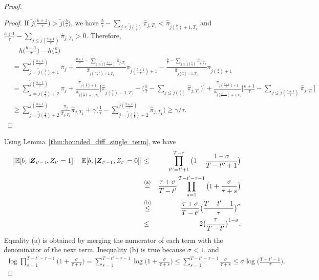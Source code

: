 \begin{proof}
\begin{proof}
If $\tilde{j}\big(\frac{b+1}{\tau}\big)  > \tilde{j}\big(\frac{b}{\tau}\big)$,  we have  $\frac{b}{\tau} - \sum_{j\leq \tilde{j}(\frac{b}{\tau})} \hat{\pi}_{j,T_1} < \hat{\pi}_{\tilde{j}(\frac{b}{\tau})+1,T_1}$ and $\frac{b+1}{\tau} - \sum_{j\leq \tilde{j}(\frac{b+1}{\tau})} \hat{\pi}_{j,T_1} > 0$. Therefore,
\begin{align}
&\quad h\big(\frac{b+1}{\tau}\big) - h\big(\frac{b}{\tau}\big) \nonumber\\
&= \sum_{j = \tilde{j}(\frac{b}{\tau}) + 1}^{\tilde{j}(\frac{b+1}{\tau})}\pi_{j} + \frac{\frac{b+1}{\tau} - \sum_{j\leq \tilde{j}(\frac{b+1}{\tau})} \hat{\pi}_{j,T_1}}{\hat{\pi}_{\tilde{j}(\frac{b+1}{\tau})+1,T_1}}\pi_{\tilde{j}(\frac{b+1}{\tau})+1} - \frac{\frac{b}{\tau} - \sum_{j\leq \tilde{j}(\frac{b}{\tau})} \hat{\pi}_{j,T_1}}{\hat{\pi}_{\tilde{j}(\frac{b}{\tau})+1,T_1}}\pi_{\tilde{j}(\frac{b}{\tau})+1}\nonumber\\
&= \sum_{j = \tilde{j}(\frac{b}{\tau})+2}^{\tilde{j}(\frac{b+1}{\tau})}\pi_{j} +\frac{\pi_{\tilde{j}(\frac{b}{\tau})+1}}{\hat{\pi}_{\tilde{j}(\frac{b}{\tau})+1,T_1}}\bigg[\hat{\pi}_{\tilde{j}(\frac{b}{\tau})+1,T_1} - \big(\frac{b}{\tau} - \sum_{j\leq \tilde{j}(\frac{b}{\tau})} \hat{\pi}_{j,T_1}\big) \bigg]+
\frac{\pi_{\tilde{j}(\frac{b+1}{\tau})+1}}{\hat{\pi}_{\tilde{j}(\frac{b+1}{\tau})+1,T_1}}\bigg[\frac{b+1}{\tau} - \sum_{j\leq \tilde{j}(\frac{b+1}{\tau})} \hat{\pi}_{j,T_1}\bigg]\nonumber\\
&\geq \sum_{j = \tilde{j}(\frac{b}{\tau})+2}^{\tilde{j}(\frac{b+1}{\tau})}\frac{\pi_j}{\hat{\pi}_{j,T_1}}\hat{\pi}_{j,T_1} + \gamma \bigg(\frac{1}{\tau} -  \sum_{j = \tilde{j}(\frac{b}{\tau})+2}^{\tilde{j}(\frac{b+1}{\tau})}\hat{\pi}_{j,T_1}\bigg) \geq \gamma/\tau.
\end{align}
\end{proof}
Using Lemma~\ref{thm:bounded_diff_single_term}, we have
\begin{eqnarray}%
\big|\mathbb{E}[b_\tau | \boldsymbol{Z}_{t'-1}, Z_{t'} =1] - \mathbb{E}[b_{\tau}|\boldsymbol{Z}_{t'-1}, Z_{t'} = 0]\big| &\leq& \prod_{t'' = t'+1}^{T-\tau}\big(1 - \frac{1-\sigma}{T-t''+1}\big) \nonumber\\
&\overset{(\rm a)}{=}&\frac{\tau + \sigma}{T-t'}\prod_{s = 1}^{T-t'-\tau-1}\big(1+\frac{\sigma}{\tau+s} \big)\nonumber\\
&\overset{(\rm b)}{\leq}&\frac{\tau + \sigma}{T-t'}\big(\frac{T-t'-1}{\tau} \big)^{\sigma} \nonumber \\
&\leq &2\big(\frac{\tau}{T-t'}\big)^{1-\sigma}. \nonumber
\end{eqnarray}
Equality (a) is obtained by merging the numerator of each term with the denominator of the next term. Inequality (b) is true because $\sigma < 1$, and
\begin{eqnarray}%
\log \prod_{s = 1}^{T-t'-\tau-1}\big(1+\frac{\sigma}{\tau+s} \big) = \sum_{s = 1}^{T-t'-\tau-1}\log \big(1+\frac{\sigma}{\tau+s} \big) \leq\sum_{s = 1}^{T-t'-\tau-1}\frac{\sigma}{\tau+s}  \leq \sigma \log\big(\frac{T-t'-1}{\tau} \big). \nonumber
\end{eqnarray}
\end{proof}
